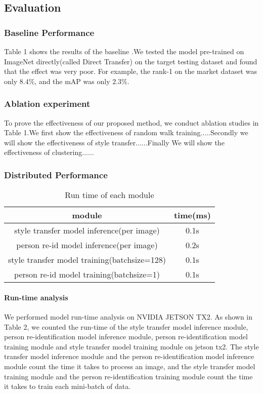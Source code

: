 \documentclass{article}
\begin{document}
\subsection{Evaluation}

\subsubsection{Baseline Performance}
Table 1 shows the results of the baseline .We tested the model pre-trained on ImageNet directly(called Direct Transfer) on the target testing dataset and found that the effect was very poor. For example, the rank-1 on the market dataset was only $8.4\%$, and the mAP was only $2.3\%$. 

\subsubsection{Ablation experiment}
To prove the effectiveness of our proposed method,  we conduct ablation studies in Table 1.We first show the effectiveness of random walk training.....Secondly we will show the effectiveness of style transfer......Finally We will show the effectiveness of clustering......


\subsubsection{Distributed Performance}


\begin{table}
\centering
\begin{tabular}{c|c}
\hline
module  & time(ms) \\
\hline
style transfer model inference(per image)   & 0.1s  \\
person re-id model inference(per image)     & 0.2s  \\
style transfer model training(batchsize=128)    & 0.1s  \\
person re-id model training(batchsize=1)      & 0.1s  \\
\hline
\end{tabular}
\caption{Run time of each module}
\label{tab:plain}
\end{table}


\paragraph{Run-time analysis}
We performed model run-time analysis on NVIDIA JETSON TX2. As shown in Table 2, we counted the run-time of the style transfer model inference module, person re-identification model inference module, person re-identification model training module and style transfer model training module  on jetson tx2. The style transfer model inference module and the person re-identification model inference module count the time it takes to process an image, and the style transfer model training module and the person re-identification training module count the time it takes to train each mini-batch of data.
\end{document}
